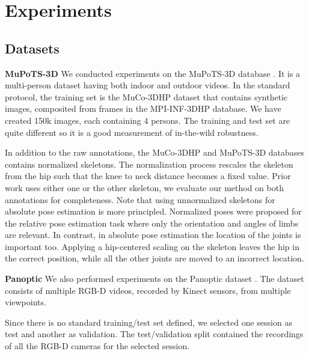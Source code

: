 \documentclass[runningheads]{llncs}
\begin{document}
\section{Experiments}
\subsection{Datasets} \label{sec:datasets}

\textbf{MuPoTS-3D} We conducted experiments on the MuPoTS-3D database \cite{mehta2018single_shot}. It is a multi-person dataset having both indoor and outdoor videos. In the standard protocol, the training set is the MuCo-3DHP dataset \cite{mehta2018single_shot} that contains synthetic images, composited from frames in the MPI-INF-3DHP \cite{mehta} database. We have created 150k images, each containing 4 persons. The training and test set are quite different so it is a good measurement of in-the-wild robustness.

In addition to the raw annotations, the MuCo-3DHP and MuPoTS-3D databases contains normalized skeletons. The normalization process rescales the skeleton from the hip such that the knee to neck distance becomes a fixed value. Prior work uses either one or the other skeleton, we evaluate our method on both annotations for completeness. Note that using unnormalized skeletons for absolute pose estimation is more principled. Normalized poses were proposed for the relative pose estimation task where only the orientation and angles of limbs are relevant. In contrast, in absolute pose estimation the location of the joints is important too. Applying a hip-centered scaling on the skeleton leaves the hip in the correct position, while all the other joints are moved to an incorrect location.

\textbf{Panoptic} We also performed experiments on the Panoptic dataset \cite{panoptic}. The dataset consists of multiple RGB\nobreakdash-D videos, recorded by Kinect sensors, from multiple viewpoints.

Since there is no standard training/test set defined, we selected one session as test and another as validation. The test/validation split contained the recordings of all the RGB-D cameras for the selected session.
\end{document}
